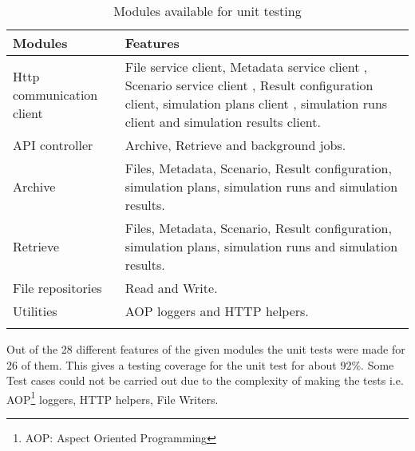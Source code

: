 \begin{longtable}{|p{3cm}|p{10cm}|}
    \hline
        \textbf{Modules} & \textbf{Features}\\
    \hline
        Http communication client & File service client, Metadata service client , Scenario service client , Result configuration client, simulation plans client
        , simulation runs client  and simulation results client.\\    
    \hline
        API controller & Archive, Retrieve and background jobs.\\    
    \hline
        Archive & Files, Metadata, Scenario, Result configuration, simulation plans, simulation runs and simulation results.\\  
    \hline
        Retrieve & Files, Metadata, Scenario, Result configuration, simulation plans, simulation runs and simulation results.\\ 
    \hline
        File repositories & Read and Write.\\ 
    \hline
        Utilities & AOP loggers and HTTP helpers.\\ 
    \hline
    \caption{Modules available for unit testing}
    \label{table:unitTestCov} 
\end{longtable}

Out of the 28 different features of the given modules the unit tests were made for 26 of them. This gives a testing coverage for the unit test for about
92\%. Some Test cases could not be carried out due to the complexity of making the tests i.e. AOP\footnote{AOP: Aspect Oriented Programming} loggers, HTTP helpers, File Writers.